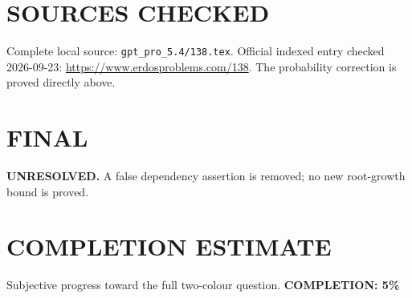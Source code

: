 \section{SOURCES CHECKED}
Complete local source: \texttt{gpt\_pro\_5.4/138.tex}. Official indexed entry checked 2026-09-23: \url{https://www.erdosproblems.com/138}. The probability correction is proved directly above.
\section{FINAL}
\textbf{UNRESOLVED.} A false dependency assertion is removed; no new root-growth bound is proved.
\section{COMPLETION ESTIMATE}
Subjective progress toward the full two-colour question.
\textbf{COMPLETION: 5\%}
